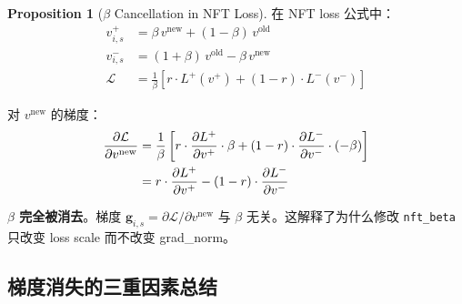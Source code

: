 \documentclass[11pt,a4paper]{article}
\newcommand{\loss}{\mathcal{L}}
\theoremstyle{definition}
\newtheorem{proposition}{Proposition}
\begin{document}
\begin{proposition}[$\beta$ Cancellation in NFT Loss]
\label{prop:beta_cancel}
在 NFT loss 公式中：
\begin{align}
v^+_{i,s} &= \beta\, v^{\mathrm{new}} + (1 - \beta)\, v^{\mathrm{old}} \\
v^-_{i,s} &= (1 + \beta)\, v^{\mathrm{old}} - \beta\, v^{\mathrm{new}} \\
\loss &= \frac{1}{\beta}\left[r \cdot L^+(v^+) + (1-r) \cdot L^-(v^-)\right]
\end{align}

对 $v^{\mathrm{new}}$ 的梯度：
\begin{align}
\frac{\partial \loss}{\partial v^{\mathrm{new}}} &= \frac{1}{\beta}\left[r \cdot \frac{\partial L^+}{\partial v^+} \cdot \beta + (1-r) \cdot \frac{\partial L^-}{\partial v^-} \cdot (-\beta)\right] \notag \\
&= r \cdot \frac{\partial L^+}{\partial v^+} - (1-r) \cdot \frac{\partial L^-}{\partial v^-}
\label{eq:beta_cancels}
\end{align}

\textbf{$\beta$ 完全被消去}。梯度 $\mathbf{g}_{i,s} = \partial\loss/\partial v^{\mathrm{new}}$ 与 $\beta$ 无关。这解释了为什么修改 \texttt{nft\_beta} 只改变 loss scale 而不改变 grad\_norm。
\end{proposition}

\subsection{梯度消失的三重因素总结}
\end{document}
